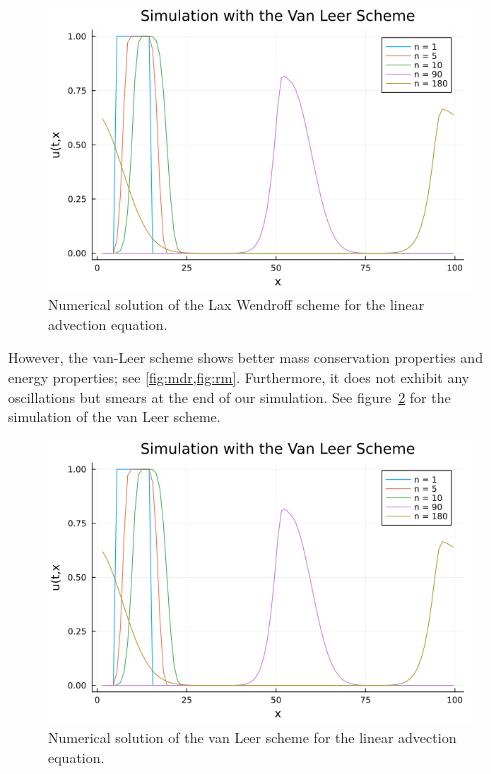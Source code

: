 \begin{figure}
    \centering
    \includegraphics[width=0.66\linewidth]{./images/rectangle-simulation-vanleer.png}
    \caption{Numerical solution of the Lax Wendroff scheme for the linear advection equation.}
    \label{fig:sim-laxwendroff}
\end{figure}

However, the van-Leer scheme shows better mass conservation properties and energy properties; see
\cref{fig:mdr,fig:rm}. Furthermore, it does not exhibit any oscillations but smears at the end of
our simulation. See figure~\cref{fig:sim-vanleer} for the simulation of the van Leer scheme.

\begin{figure}
    \centering
    \includegraphics[width=0.66\linewidth]{./images/rectangle-simulation-vanleer.png}
    \caption{Numerical solution of the van Leer scheme for the linear advection equation.}
    \label{fig:sim-vanleer}
\end{figure}


